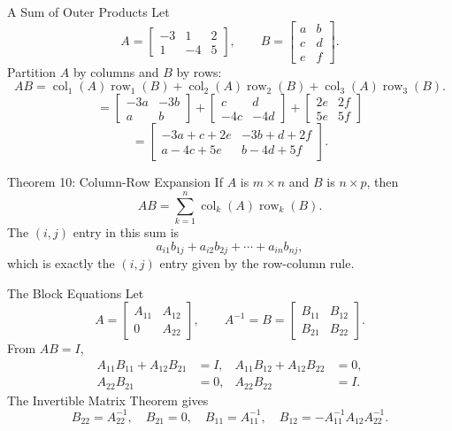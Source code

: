 \begin{frame}[shrink=8]{A Sum of Outer Products}
Let
\[
A=\begin{bmatrix}-3&1&2\\1&-4&5\end{bmatrix},\qquad
B=\begin{bmatrix}a&b\\c&d\\e&f\end{bmatrix}.
\]
\pause
Partition $A$ by columns and $B$ by rows:
\[
AB=\operatorname{col}_1(A)\operatorname{row}_1(B)
+\operatorname{col}_2(A)\operatorname{row}_2(B)
+\operatorname{col}_3(A)\operatorname{row}_3(B).
\]
\pause
\[
=\begin{bmatrix}-3a&-3b\\a&b\end{bmatrix}
+\begin{bmatrix}c&d\\-4c&-4d\end{bmatrix}
+\begin{bmatrix}2e&2f\\5e&5f\end{bmatrix}
\]
\[
=\begin{bmatrix}-3a+c+2e&-3b+d+2f\\a-4c+5e&b-4d+5f\end{bmatrix}.
\]
\end{frame}

\begin{frame}[shrink=5]{Theorem 10: Column-Row Expansion}
If $A$ is $m\times n$ and $B$ is $n\times p$, then
\[
AB=\sum_{k=1}^{n}\operatorname{col}_k(A)\operatorname{row}_k(B).
\]
The $(i,j)$ entry in this sum is
\[
a_{i1}b_{1j}+a_{i2}b_{2j}+\cdots+a_{in}b_{nj},
\]
which is exactly the $(i,j)$ entry given by the row-column rule.
\end{frame}

\begin{frame}[shrink=4]{The Block Equations}
Let
\[
A=\begin{bmatrix}A_{11}&A_{12}\\0&A_{22}\end{bmatrix},\qquad
A^{-1}=B=\begin{bmatrix}B_{11}&B_{12}\\B_{21}&B_{22}\end{bmatrix}.
\]
From $AB=I$,
\[
\begin{aligned}
A_{11}B_{11}+A_{12}B_{21}&=I, &
A_{11}B_{12}+A_{12}B_{22}&=0,\\
A_{22}B_{21}&=0, &
A_{22}B_{22}&=I.
\end{aligned}
\]
\pause
The Invertible Matrix Theorem gives
\[
B_{22}=A_{22}^{-1},\quad B_{21}=0,\quad B_{11}=A_{11}^{-1},\quad
B_{12}=-A_{11}^{-1}A_{12}A_{22}^{-1}.
\]
\end{frame}

